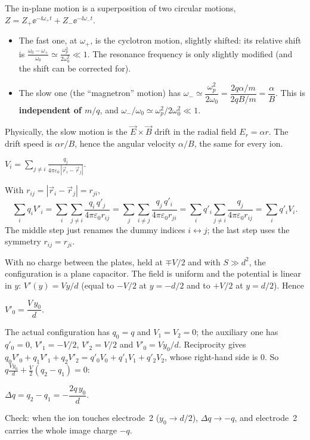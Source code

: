 \documentclass[11pt,a4paper]{article}
\newcommand{\vv}[1]{\vec{#1}}
\begin{document}
The in-plane motion is a superposition of two circular motions,
$Z = Z_+\ee^{-\ii\omega_+t} + Z_-\ee^{-\ii\omega_-t}$.
\begin{itemize}
\item The fast one, at $\omega_+$, is the cyclotron motion, slightly shifted: its relative
  shift is $\frac{\omega_0-\omega_+}{\omega_0}\simeq\frac{\omega_p^2}{2\omega_0^2}\ll1$. The
  resonance frequency is only slightly modified (and the shift can be corrected for).
\item The slow one (the ``magnetron'' motion) has
  $\omega_-\simeq\dfrac{\omega_p^2}{2\omega_0} = \dfrac{2q\alpha/m}{2qB/m} = \dfrac\alpha B$.
  This is \textbf{independent of $m/q$}, and $\omega_-/\omega_0\simeq\omega_p^2/2\omega_0^2\ll1$.
\end{itemize}
Physically, the slow motion is the $\vv E\times\vv B$ drift in the radial field $E_r = \alpha r$.
The drift speed is $\alpha r/B$, hence the angular velocity $\alpha/B$, the same for every ion.


$V_i = \displaystyle\sum_{j\ne i}\frac{q_j}{4\pi\varepsilon_0\,|\vv r_i - \vv r_j|}$.

With $r_{ij} = |\vv r_i-\vv r_j| = r_{ji}$,
\[
  \sum_iq_iV'_i = \sum_i\sum_{j\ne i}\frac{q_i\,q'_j}{4\pi\varepsilon_0r_{ij}}
  = \sum_j\sum_{i\ne j}\frac{q_j\,q'_i}{4\pi\varepsilon_0r_{ji}}
  = \sum_iq'_i\sum_{j\ne i}\frac{q_j}{4\pi\varepsilon_0r_{ij}} = \sum_iq'_iV_i .
\]
The middle step just renames the dummy indices $i\leftrightarrow j$; the last step uses the
symmetry $r_{ij} = r_{ji}$.

With no charge between the plates, held at $\mp V/2$ and with $S\gg d^2$, the configuration is
a plane capacitor. The field is uniform and the potential is linear in $y$:
$V'(y) = Vy/d$ (equal to $-V/2$ at $y = -d/2$ and to $+V/2$ at $y = d/2$). Hence
\begin{result}
$V'_0 = \dfrac{V\,y_0}{d}$.
\end{result}

The actual configuration has $q_0 = q$ and $V_1 = V_2 = 0$; the auxiliary one has $q'_0 = 0$,
$V'_1 = -V/2$, $V'_2 = V/2$ and $V'_0 = Vy_0/d$. Reciprocity gives
$q_0V'_0 + q_1V'_1 + q_2V'_2 = q'_0V_0 + q'_1V_1 + q'_2V_2$, whose right-hand side is $0$.
So $q\frac{Vy_0}{d} + \frac V2(q_2-q_1) = 0$:
\begin{result}
$\Delta q = q_2 - q_1 = -\dfrac{2q\,y_0}{d}$.
\end{result}
Check: when the ion touches electrode~2 ($y_0\to d/2$), $\Delta q\to-q$, and electrode~2 carries
the whole image charge $-q$.
\end{document}

